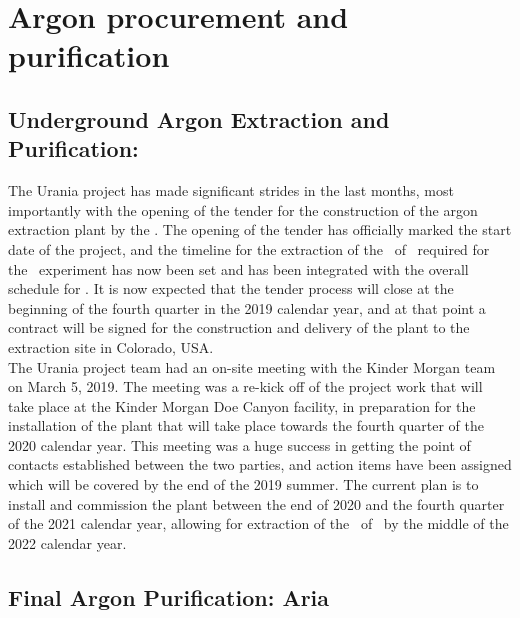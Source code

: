 \section{Argon procurement and purification}
\label{sec:Ar}


\subsection{Underground Argon Extraction and Purification: \Urania}
\label{sec:Ar-Urania}

The Urania project has made significant strides in the last months, most importantly with the opening of the tender for the construction of the argon extraction plant by the \INFN.  The opening of the tender has officially marked the start date of the project, and the timeline for the extraction of the \UraniaTotalDSkProduction\ of \UAr\ required for the \DSks\ experiment has now been set and has been integrated with the overall schedule for \DSks.  It is now expected that the tender process will close at the beginning of the fourth quarter in the 2019 calendar year, and at that point a contract will be signed for the construction and delivery of the plant to the extraction site in Colorado, USA.  \\
The Urania project team had an on-site meeting with the Kinder Morgan team on March 5, 2019.  The meeting was a re-kick off of the project work that will take place at the Kinder Morgan Doe Canyon facility, in preparation for the installation of the plant that will take place towards the fourth quarter of the 2020 calendar year.  This meeting was a huge success in getting the point of contacts established between the two parties, and action items have been assigned which will be covered by the end of the 2019 summer.  The current plan is to install and commission the plant between the end of 2020 and the fourth quarter of the 2021 calendar year, allowing for extraction of the \UraniaTotalDSkProduction\ of \UAr\ by the middle of the 2022 calendar year.


\subsection{Final Argon Purification: Aria}
\label{sec:Ar-Aria}

